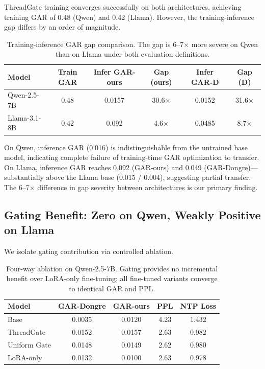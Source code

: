 \documentclass[11pt,a4paper]{article}
\begin{document}
ThreadGate training converges successfully on both architectures, achieving training GAR of 0.48 (Qwen) and 0.42 (Llama).
However, the training-inference gap differs by an order of magnitude.

\begin{table}[h]
\centering
\small
\caption{Training-inference GAR gap comparison. The gap is 6--7$\times$ more severe on Qwen than on Llama under both evaluation definitions.}
\label{tab:gap}
\begin{tabular}{lccccc}
\toprule
\textbf{Model} & \textbf{Train GAR} & \textbf{Infer GAR-ours} & \textbf{Gap (ours)} & \textbf{Infer GAR-D} & \textbf{Gap (D)} \\
\midrule
Qwen-2.5-7B & 0.48 & 0.0157 & 30.6$\times$ & 0.0152 & 31.6$\times$ \\
Llama-3.1-8B & 0.42 & 0.092 & 4.6$\times$ & 0.0485 & 8.7$\times$ \\
\bottomrule
\end{tabular}
\end{table}

On Qwen, inference GAR (0.016) is indistinguishable from the untrained base model, indicating complete failure of training-time GAR optimization to transfer.
On Llama, inference GAR reaches 0.092 (GAR-ours) and 0.049 (GAR-Dongre)---substantially above the Llama base (0.015 / 0.004), suggesting partial transfer.
The 6--7$\times$ difference in gap severity between architectures is our primary finding.

\subsection{Gating Benefit: Zero on Qwen, Weakly Positive on Llama}
\label{sec:ablation}

We isolate gating contribution via controlled ablation.

\begin{table}[h]
\centering
\small
\caption{Four-way ablation on Qwen-2.5-7B. Gating provides no incremental benefit over LoRA-only fine-tuning; all fine-tuned variants converge to identical GAR and PPL.}
\label{tab:qwen_ablation}
\begin{tabular}{lcccc}
\toprule
\textbf{Model} & \textbf{GAR-Dongre} & \textbf{GAR-ours} & \textbf{PPL} & \textbf{NTP Loss} \\
\midrule
Base & 0.0035 & 0.0120 & 4.23 & 1.432 \\
ThreadGate & 0.0152 & 0.0157 & 2.63 & 0.982 \\
Uniform Gate & 0.0148 & 0.0149 & 2.62 & 0.980 \\
LoRA-only & 0.0132 & 0.0100 & 2.63 & 0.978 \\
\bottomrule
\end{tabular}
\end{table}
\end{document}
